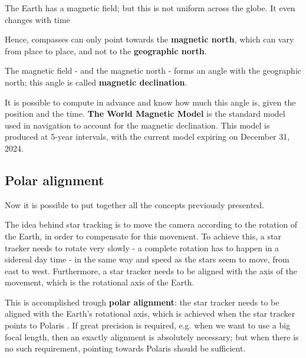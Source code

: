 \documentclass[]{article}
\begin{document}
The Earth has a magnetic field; but this is not uniform across the globe. It even changes with time \cite{magndecl}

Hence, compasses can only point towards the \textbf{magnetic north}, which can vary from place to place, and not to the \textbf{geographic north}. 

The magnetic field - and the magnetic north - forms an angle with the geographic north; this angle is called \textbf{magnetic declination}. 

It is possible to compute in advance and know how much this angle is, given the position and the time. \textbf{The World Magnetic Model} \cite{wmm2020} is the standard model used in navigation to account for the magnetic declination. This model is produced at 5-year intervals, with the current model expiring on December 31, 2024.
\\
\subsection{Polar alignment}
Now it is possible to put together all the concepts previously presented. 

The idea behind star tracking is to move the camera according to the rotation of the Earth, in order to compensate for this movement. To achieve this, a star tracker needs to rotate very slowly  - a complete rotation has to happen in a sidereal day time   - in the same way and speed as the stars seem to move, from east to west. Furthermore, a star tracker needs to be aligned with the axis of the movement, which is the rotational axis of the Earth. 

This is accomplished trough \textbf{polar alignment}: the star tracker needs to be aligned with the Earth's rotational axis, which is achieved when the star tracker points to Polaris \cite{polaralignment}. If great precision is required, e.g. when we want to use a big focal length, then an exactly alignment is absolutely necessary; but when there is no such requirement, pointing towards Polaris should be sufficient.
\end{document}
